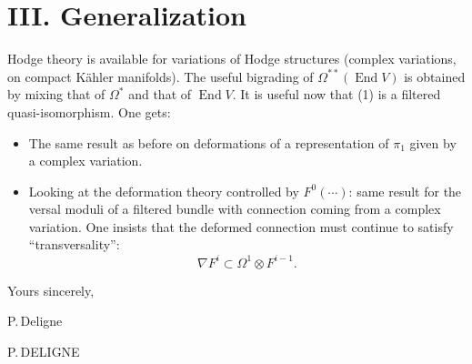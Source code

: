 \documentclass[11pt,a4paper]{article}
\DeclareMathOperator{\End}{End}
\begin{document}
\section*{III. Generalization}

Hodge theory is available for variations of Hodge structures (complex variations, on compact K\"ahler manifolds). The useful bigrading of $\Omega^{**}(\End V)$ is obtained by mixing that of $\Omega^*$ and that of $\End V$. It is useful now that (1) is a filtered quasi-isomorphism. One gets:

\vspace{0.2cm}

\begin{itemize}[leftmargin=1cm]
\item[a)] The same result as before on deformations of a representation of $\pi_1$ given by a complex variation.
\item[b)] Looking at the deformation theory controlled by $F^0(\cdots)$: same result for the versal moduli of a filtered bundle with connection coming from a complex variation. One insists that the deformed connection must continue to satisfy ``transversality'':
\[
\nabla F^i \subset \Omega^1 \otimes F^{i-1}.
\]
\end{itemize}

\vspace{1.5cm}

\begin{flushright}
Yours sincerely,

\vspace{0.8cm}
P.\,Deligne

\vspace{0.2cm}
P.\,DELIGNE
\end{flushright}
\end{document}
